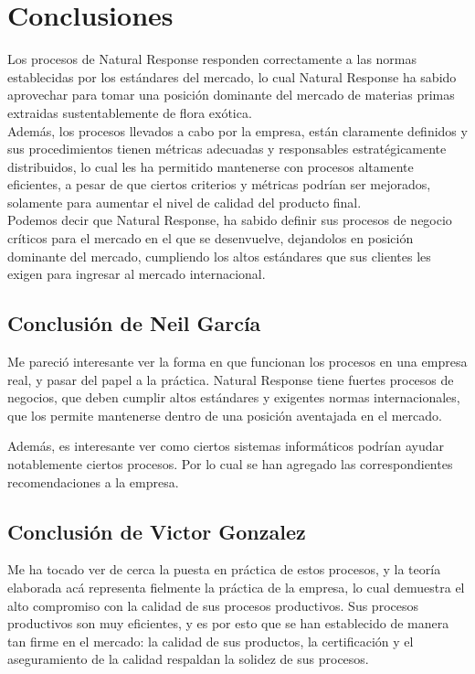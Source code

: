 \documentclass[12pt,letterpaper]{article}
\begin{document}
\section{Conclusiones}
Los procesos de Natural Response responden correctamente a las normas establecidas por los estándares del mercado, lo cual Natural Response ha sabido aprovechar para tomar una posición dominante del mercado de materias primas extraidas sustentablemente de flora exótica.\\

Además, los procesos llevados a cabo por la empresa, están claramente definidos y sus procedimientos tienen métricas adecuadas y responsables estratégicamente distribuidos, lo cual les ha permitido mantenerse con procesos altamente eficientes, a pesar de que ciertos criterios y métricas podrían ser mejorados, solamente para aumentar el nivel de calidad del producto final.\\

Podemos decir que Natural Response, ha sabido definir sus procesos de negocio críticos para el mercado en el que se desenvuelve, dejandolos en posición dominante del mercado, cumpliendo los altos estándares que sus clientes les exigen para ingresar al mercado internacional.

\subsection{Conclusión de Neil García}
Me pareció interesante ver la forma en que funcionan los procesos en una empresa real, y pasar del papel a la práctica. Natural Response tiene fuertes procesos de negocios, que deben cumplir altos estándares y exigentes normas internacionales, que los permite mantenerse dentro de una posición aventajada en el mercado.

Además, es interesante ver como ciertos sistemas informáticos podrían ayudar notablemente ciertos procesos. Por lo cual se han agregado las correspondientes recomendaciones a la empresa.

\subsection{Conclusión de Victor Gonzalez}
Me ha tocado ver de cerca la puesta en práctica de estos procesos, y la teoría elaborada acá representa fielmente la práctica de la empresa, lo cual demuestra el alto compromiso con la calidad de sus procesos productivos. Sus procesos productivos son muy eficientes, y es por esto que se han establecido de manera tan firme en el mercado: la calidad de sus productos, la certificación y el aseguramiento de la calidad respaldan la solidez de sus procesos.\\
\end{document}
